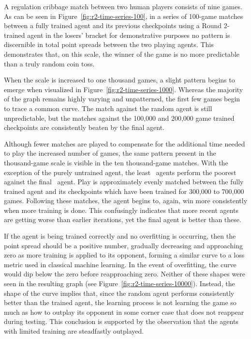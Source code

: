A regulation cribbage match between two human players consists of nine games.
%
As can be seen in Figure~\ref{fig:r2-time-series-100},
in a series of 100-game matches between a fully trained agent and its
previous checkpoints\textemdash
using a Round 2-trained agent in the losers' bracket for demonstrative
purposes\textemdash
no pattern is discernible in total point spreads between the two playing agents.
%
This demonstrates that,
on this scale,
the winner of the game is no more predictable than a truly random coin toss.

When the scale is increased to one thousand games,
a slight pattern begins to emerge
when visualized in Figure~\ref{fig:r2-time-series-1000}.
%
Whereas the majority of the graph remains highly varying and unpatterned,
the first few games begin to trace a common curve.
%
The match against the random agent is still unpredictable,
but the matches against the 100,000 and 200,000 game trained checkpoints are
consistently beaten by the final agent.

Although fewer matches are played to compensate for the additional time needed to
play the increased number of games,
the same pattern present in the thousand-game scale is visible in the
ten thousand-game matches.
%
With the exception of the purely untrained agent,
the least \learned\ agents perform the poorest against the final
\learned\ agent.
%
Play is approximately evenly matched between the fully trained agent
and its checkpoints which have been trained for 300,000 to 700,000 games.
%
Following these matches,
the agent begins to, again, win more consistently when more training is done.
%
This confusingly indicates that more recent agents are getting worse
than earlier iterations,
yet the final agent is better than these.

If the agent is being trained correctly and no overfitting is occurring,
then the point spread should be a positive number,
gradually decreasing and approaching zero
as more training is applied to its opponent,
forming a similar curve to a loss metric used in classical machine learning.
%
In the event of overfitting,
the curve would dip below the zero before reapproaching zero.
%
Neither of these shapes were seen in the resulting graph
(see Figure~\ref{fig:r2-time-series-10000}).
%
Instead,
the shape of the curve implies that,
since the random agent performs consistently better than the trained agent,
the learning process is not learning the game so much as how to outplay its
opponent in some corner case that does not reappear during testing.
%
This conclusion is supported by the observation that the agents with limited
training are steadfastly outplayed.

